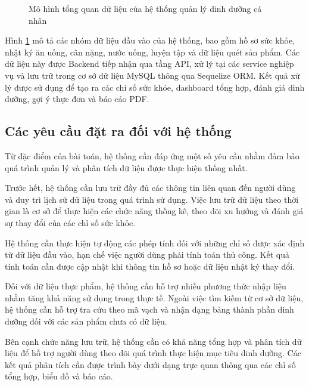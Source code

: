 \documentclass[12pt, a4paper]{report}
\begin{document}
\begin{figure}[htbp]
{
    }
    \caption{Mô hình tổng quan dữ liệu của hệ thống quản lý dinh dưỡng cá nhân}
    \label{fig:tong_quan_bai_toan}
\end{figure}

Hình \ref{fig:tong_quan_bai_toan} mô tả các nhóm dữ liệu đầu vào của hệ thống, bao gồm hồ sơ sức khỏe, nhật ký ăn uống, cân nặng, nước uống, luyện tập và dữ liệu quét sản phẩm. Các dữ liệu này được Backend tiếp nhận qua tầng API, xử lý tại các service nghiệp vụ và lưu trữ trong cơ sở dữ liệu MySQL thông qua Sequelize ORM. Kết quả xử lý được sử dụng để tạo ra các chỉ số sức khỏe, dashboard tổng hợp, đánh giá dinh dưỡng, gợi ý thực đơn và báo cáo PDF.

\subsection{Các yêu cầu đặt ra đối với hệ thống}Từ đặc điểm của bài toán, hệ thống cần đáp ứng một số yêu cầu nhằm đảm bảo quá trình quản lý và phân tích dữ liệu được thực hiện thống nhất.

Trước hết, hệ thống cần lưu trữ đầy đủ các thông tin liên quan đến người dùng và duy trì lịch sử dữ liệu trong quá trình sử dụng. Việc lưu trữ dữ liệu theo thời gian là cơ sở để thực hiện các chức năng thống kê, theo dõi xu hướng và đánh giá sự thay đổi của các chỉ số sức khỏe.

Hệ thống cần thực hiện tự động các phép tính đối với những chỉ số được xác định từ dữ liệu đầu vào, hạn chế việc người dùng phải tính toán thủ công. Kết quả tính toán cần được cập nhật khi thông tin hồ sơ hoặc dữ liệu nhật ký thay đổi.

Đối với dữ liệu thực phẩm, hệ thống cần hỗ trợ nhiều phương thức nhập liệu nhằm tăng khả năng sử dụng trong thực tế. Ngoài việc tìm kiếm từ cơ sở dữ liệu, hệ thống cần hỗ trợ tra cứu theo mã vạch và nhận dạng bảng thành phần dinh dưỡng đối với các sản phẩm chưa có dữ liệu.

Bên cạnh chức năng lưu trữ, hệ thống cần có khả năng tổng hợp và phân tích dữ liệu để hỗ trợ người dùng theo dõi quá trình thực hiện mục tiêu dinh dưỡng. Các kết quả phân tích cần được trình bày dưới dạng trực quan thông qua các chỉ số tổng hợp, biểu đồ và báo cáo.
\end{document}
